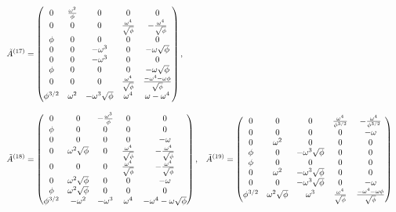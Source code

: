 \begin{align}
  \tilde{A}^{(17)} &= \begin{pmatrix}
    0 & \frac{\omega^2}{\phi} & 0 & 0 & 0 \\
    0 & 0 & 0 & \frac{\omega^4}{\sqrt{\phi}} & -\frac{\omega^4}{\sqrt{\phi}} \\
    \phi & 0 & 0 & 0 & 0 \\
    0 & 0 & -\omega^3 & 0 & -\omega\sqrt{\phi} \\
    0 & 0 & -\omega^3 & 0 & 0 \\
    \phi & 0 & 0 & 0 & -\omega\sqrt{\phi} \\
    0 & 0 & 0 & \frac{\omega^4}{\sqrt{\phi}} & \frac{-\omega^4-\omega \phi}{\sqrt{\phi}} \\
    \phi^{3/2} & \omega^2 & -\omega^3\sqrt{\phi} & \omega^4 & \omega-\omega^4 \\
  \end{pmatrix}, \notag \\[2ex]
  \tilde{A}^{(18)} &= \begin{pmatrix}
    0 & 0 & -\frac{\omega^3}{\phi} & 0 & 0 \\
    \phi & 0 & 0 & 0 & 0 \\
    0 & 0 & 0 & 0 & -\omega \\
    0 & \omega^2 \sqrt{\phi} & 0 & \frac{\omega^4}{\sqrt{\phi}} & -\frac{\omega^4}{\sqrt{\phi}} \\
    0 & 0 & 0 & \frac{\omega^4}{\sqrt{\phi}} & -\frac{\omega^4}{\sqrt{\phi}} \\
    0 & \omega^2 \sqrt{\phi} & 0 & 0 & -\omega \\
    \phi & \omega^2 \sqrt{\phi} & 0 & 0 & 0 \\
    \phi^{3/2} & -\omega^2 & -\omega^3 & \omega^4 & -\omega^4-\omega \sqrt{\phi} \\
  \end{pmatrix}, &
  \tilde{A}^{(19)} &= \begin{pmatrix}
    0 & 0 & 0 & \frac{\omega^4}{\phi^{3/2}} & -\frac{\omega^4}{\phi^{3/2}} \\
    0 & 0 & 0 & 0 & -\omega \\
    0 & \omega^2 & 0 & 0 & 0 \\
    \phi & 0 & -\omega^3\sqrt{\phi} & 0 & 0 \\
    \phi & 0 & 0 & 0 & 0 \\
    0 & \omega^2 & -\omega^3\sqrt{\phi} & 0 & 0 \\
    0 & 0 & -\omega^3\sqrt{\phi} & 0 & -\omega \\
    \phi^{3/2} & \omega^2 \sqrt{\phi} & \omega^3 & \frac{\omega^4}{\sqrt{\phi}} & \frac{-\omega^4-\omega \phi}{\sqrt{\phi}} \\

\end{pmatrix}
\end{align}
